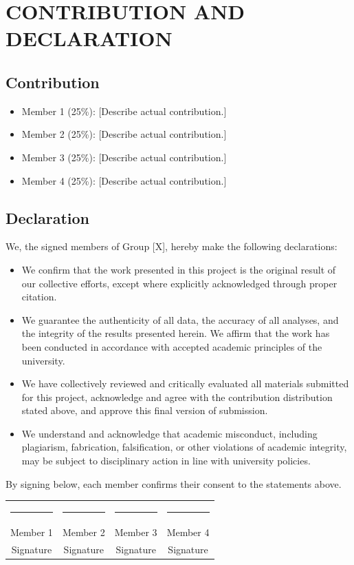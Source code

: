 \section*{CONTRIBUTION AND DECLARATION}

\subsection*{Contribution}
\begin{itemize}
    \item Member 1 (25\%): [Describe actual contribution.]
    \item Member 2 (25\%): [Describe actual contribution.]
    \item Member 3 (25\%): [Describe actual contribution.]
    \item Member 4 (25\%): [Describe actual contribution.]
\end{itemize}

\subsection*{Declaration}
We, the signed members of Group [X], hereby make the following declarations:
\begin{itemize}
    \item We confirm that the work presented in this project is the original result of our collective efforts, except where explicitly acknowledged through proper citation.
    \item We guarantee the authenticity of all data, the accuracy of all analyses, and the integrity of the results presented herein. We affirm that the work has been conducted in accordance with accepted academic principles of the university.
    \item We have collectively reviewed and critically evaluated all materials submitted for this project, acknowledge and agree with the contribution distribution stated above, and approve this final version of submission.
    \item We understand and acknowledge that academic misconduct, including plagiarism, fabrication, falsification, or other violations of academic integrity, may be subject to disciplinary action in line with university policies.
\end{itemize}

By signing below, each member confirms their consent to the statements above.

\begin{center}
\begin{tabular}{cccc}
\rule{0.20\linewidth}{0.4pt} &
\rule{0.20\linewidth}{0.4pt} &
\rule{0.20\linewidth}{0.4pt} &
\rule{0.20\linewidth}{0.4pt} \\
Member 1 & Member 2 & Member 3 & Member 4 \\
Signature & Signature & Signature & Signature
\end{tabular}
\end{center}

